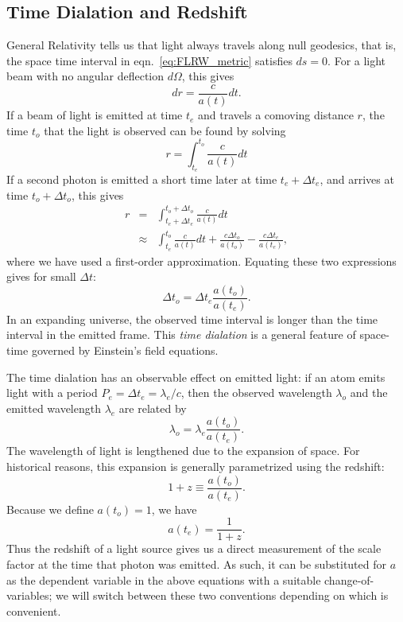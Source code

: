 \subsection{Time Dialation and Redshift}
General Relativity tells us
that light always travels along null geodesics, that is, the space time
interval in eqn.~\ref{eq:FLRW_metric} satisfies $ds = 0$.  For a light
beam with no angular deflection $d\Omega$, this gives
\begin{equation}
  dr = \frac{c}{a(t)} dt.
\end{equation}
If a beam of light is emitted at time $t_e$ and travels
a comoving distance $r$, the
time $t_o$ that the light is observed can be found by solving
\begin{equation}
  r = \int_{t_e}^{t_o} \frac{c}{a(t)} dt
\end{equation}
If a second photon is emitted a short time later at time $t_e + \Delta t_e$,
and arrives at time $t_o + \Delta t_o$, this gives
\begin{eqnarray}
  r &=& 
  \int_{t_e + \Delta t_e}^{t_o + \Delta t_o} \frac{c}{a(t)} dt \nonumber\\
  &\approx& \int_{t_e}^{t_o} \frac{c}{a(t)} dt + \frac{c\Delta t_o}{a(t_o)}
  - \frac{c\Delta t_e}{a(t_e)},
\end{eqnarray}
where we have used a first-order approximation.  Equating these
two expressions gives for small $\Delta t$:
\begin{equation}
  \label{eq:time_dialation}
  \Delta t_o = \Delta t_e \frac{a(t_o)}{a(t_e)}.
\end{equation}
In an expanding universe, the observed time interval is longer than
the time interval in the emitted frame.  This {\it time dialation} is
a general feature of space-time governed by Einstein's field equations.

The time dialation has an observable effect on emitted light:
if an atom emits light with a period 
$P_e = \Delta t_e = \lambda_e / c$, then the observed wavelength $\lambda_o$
and the emitted wavelength $\lambda_e$ are related by
\begin{equation}
  \lambda_o = \lambda_e \frac{a(t_o)}{a(t_e)}.
\end{equation}
The wavelength of light is lengthened due to the expansion of space.  For
historical reasons, this expansion is generally parametrized using the
redshift:
\begin{equation}
  1 + z \equiv \frac{a(t_o)}{a(t_e)}.
\end{equation}
Because we define $a(t_o) = 1$, we have
\begin{equation}
  a(t_e) = \frac{1}{1 + z}.
\end{equation}
Thus the redshift of a light source gives us a direct measurement of the
scale factor at the time that photon was emitted.  As such, it can be
substituted for $a$ as the dependent variable in the above equations
with a suitable change-of-variables; we will switch between these two
conventions depending on which is convenient.

